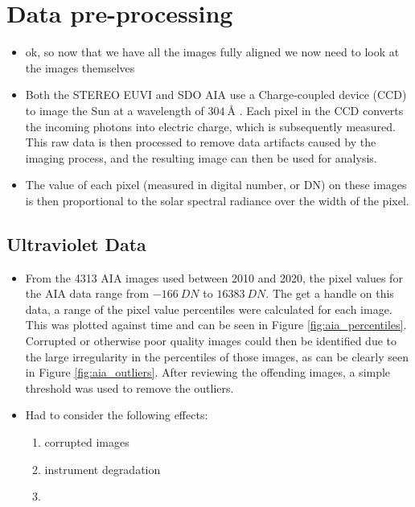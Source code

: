 \documentclass[11pt,a4paper,onecolumn]{report}
\begin{document}
\section{Data pre-processing}

\label{sec:Data prep}


\begin{itemize}
  \item ok, so now that we have all the images fully aligned we now need to look
  at the images themselves
  \item Both the STEREO EUVI and SDO AIA use a Charge-coupled device (CCD) to
  image the Sun at a wavelength of
  \(\SI[]{304}[]{\angstrom}\) \citep{kaiser_stereo_2008,lemen_atmospheric_2012}.
  Each pixel in the CCD converts the incoming photons into electric charge,
  which is subsequently measured. This raw data is then processed to remove data
  artifacts caused by the imaging process, and the resulting image can then be
  used for analysis.  
  \item The value of each pixel (measured in digital number, or DN) on these images is then proportional to the
  solar spectral radiance over the width of the pixel.
\end{itemize}

\subsection{Ultraviolet Data}
\begin{itemize}
  \item From the 4313 AIA images used between 2010 and 2020, the pixel values
  for the AIA data range from \(\SI[]{-166}[]{DN}\) to \(\SI[]{16383}[]{DN}\).
  The get a handle on this data, a range of the pixel value percentiles were
  calculated for each image. This was plotted against time and can be seen in
  Figure \ref{fig:aia_percentiles}. Corrupted or otherwise poor quality images
  could then be identified due to the large irregularity in the percentiles of
  those images, as can be clearly seen in Figure \ref{fig:aia_outliers}. After
  reviewing the offending images, a simple threshold was used to remove the
  outliers.
  \item Had to consider the following effects:
  \begin{enumerate}
    \item corrupted images
    \item instrument degradation
    \item 
  \end{enumerate}
\end{itemize}
\end{document}
